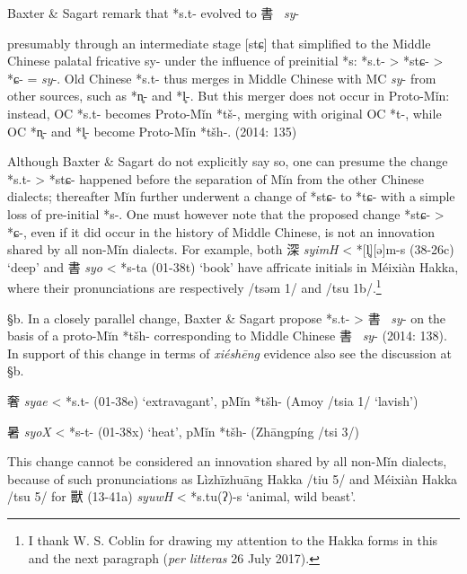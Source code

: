 Baxter \& Sagart remark that *s.t- evolved to 書~ \emph{sy}-

presumably through an intermediate stage {[}stɕ] that simplified to
the Middle Chinese palatal fricative sy- under the influence of
preinitial *s: *s.t- \textgreater{} *stɕ- \textgreater{} *ɕ- =
 \emph{sy}-. Old Chinese *s.t- thus merges in Middle Chinese with MC
 \emph{sy}- from other sources, such as *n̥- and *l̥-. But this merger does
not occur in Proto-Mǐn: instead, OC *s.t- becomes Proto-Mǐn *tš-,
merging with original OC *t-, while OC *n̥- and *l̥- become Proto-Mǐn
*tšh-. (2014: 135)

Although Baxter \& Sagart do not explicitly say so, one can presume the
change *s.t- \textgreater{} *stɕ- happened before the separation of Mĭn
from the other Chinese dialects; thereafter Mĭn further underwent a
change of *stɕ- to *tɕ- with a simple loss of pre-initial *s-. One must
however note that the proposed change *stɕ- \textgreater{} *ɕ-, even if
it did occur in the history of Middle Chinese, is not an innovation
shared by all non-Mǐn dialects. For example, both 深 \emph{syimH}
\textless{} *[l̥]{[}ə]m-s (38-26c) `deep' and 書 \emph{syo}
\textless{} *s-ta (01-38t) `book' have affricate initials in Méixiàn
Hakka, where their pronunciations are respectively /ts{}əm 1/ and /ts{}u
1b/.\footnote{I thank W. S. Coblin for drawing my attention to the Hakka
  forms in this and the next paragraph (\emph{per litteras} 26 July
  2017).}

§b. In a closely parallel change, Baxter \& Sagart propose *s.t{}-
\textgreater{} 書~ \emph{sy}- on the basis of a proto-Mĭn *tšh-
cor­re­spond­ing to Middle Chinese 書~ \emph{sy}- (2014: 138). In support
of this change in terms of  \emph{xiéshēng} evidence also see the
discussion at §b.

\begin{description} \item
奢  \emph{syae} \textless{} *s.t{}- (01-38e) `extravagant', pMǐn *tšh-
(Amoy /ts{}ia 1/ `lavish')
\end{description}

暑  \emph{syoX} \textless{} *s-t{}- (01-38x) `heat', pMǐn *tšh- (Zhāngpíng
/ts{}i 3/)

This change cannot be considered an innovation shared by all non-Mǐn
dialects, because of such pronunciations as Lìzhīzhuāng Hakka /t{}iu 5/
and Méixiàn Hakka /ts{}u 5/ for 獸 (13-41a) \emph{syuwH} \textless{}
*s.t{}u(ʔ)-s `animal, wild beast'.

